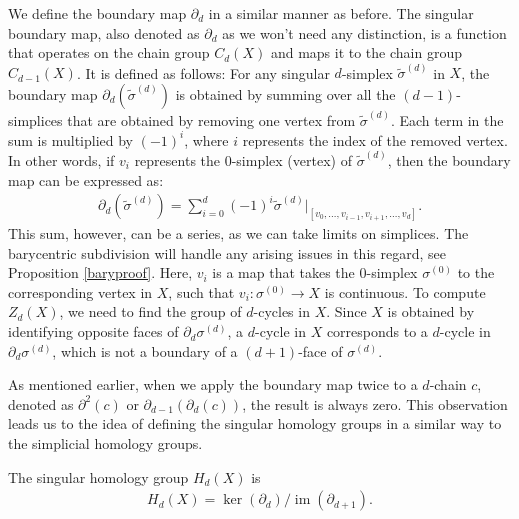 We define the boundary map \( \partial_{d} \) in a similar manner as before. The singular boundary map, also denoted as \( \partial_{d} \) as we won't need any distinction, is a function that operates on the chain group \( C_{d}(X) \) and maps it to the chain group \( C_{d-1}(X) \). It is defined as follows: For any singular \( d \)-simplex \( \tilde{\sigma}^{(d)} \) in \( X \), the boundary map \( \partial_{d}(\tilde{\sigma}^{(d)}) \) is obtained by summing over all the \( (d-1) \)-simplices that are obtained by removing one vertex from \( \tilde{\sigma}^{(d)} \). Each term in the sum is multiplied by \( (-1)^{i} \), where \( i \) represents the index of the removed vertex. In other words, if \( v_{i} \) represents the \( 0 \)-simplex (vertex) of \( \tilde{\sigma}^{(d)} \), then the boundary map can be expressed as:
\begin{align}
	\partial_{d}(\tilde{\sigma}^{(d)}) = \sum_{i=0}^{d} (-1)^{i} \tilde{\sigma}^{(d)}\vert_{[v_0, \ldots, v_{i-1}, v_{i+1}, \ldots, v_d]}. 
\end{align}
This sum, however, can be a series, as we can take limits on simplices. The barycentric subdivision will handle any arising issues in this regard, see Proposition \ref{baryproof}. Here, \( v_{i} \) is a map that takes the \( 0 \)-simplex \( \sigma^{(0)} \) to the corresponding vertex in \( X \), such that \( v_{i}: \sigma^{(0)} \to X \) is continuous. To compute \( Z_{d}(X) \), we need to find the group of \( d \)-cycles in \( X \). Since \( X \) is obtained by identifying opposite faces of \( \partial_{d} \sigma^{(d)} \), a \( d \)-cycle in \( X \) corresponds to a \( d \)-cycle in \( \partial_{d} \sigma^{(d)} \), which is not a boundary of a \( (d+1) \)-face of \( \sigma^{(d)} \).

As mentioned earlier, when we apply the boundary map twice to a \( d \)-chain \( c \), denoted as \( \partial^{2}(c) \) or \( \partial_{d-1}(\partial_{d}(c)) \), the result is always zero. This observation leads us to the idea of defining the singular homology groups in a similar way to the simplicial homology groups.

\begin{definition}
	The singular homology group \( H_{d}(X) \) is
	\begin{align}
		H_{d}(X) = \ker(\partial_{d}) / \operatorname{im}(\partial_{d+1}). 
	\end{align}
\end{definition}

